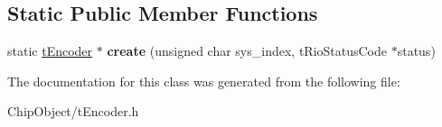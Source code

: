 \subsection*{Static Public Member Functions}
\begin{DoxyCompactItemize}
\item 
\hypertarget{classnFPGA_1_1nFRC__2012__1__6__4_1_1tEncoder_a3b56898db32875748862f154e083e887}{
static \hyperlink{classnFPGA_1_1nFRC__2012__1__6__4_1_1tEncoder}{tEncoder} $\ast$ {\bfseries create} (unsigned char sys\_\-index, tRioStatusCode $\ast$status)}
\label{classnFPGA_1_1nFRC__2012__1__6__4_1_1tEncoder_a3b56898db32875748862f154e083e887}

\end{DoxyCompactItemize}


The documentation for this class was generated from the following file:\begin{DoxyCompactItemize}
\item 
ChipObject/tEncoder.h\end{DoxyCompactItemize}
